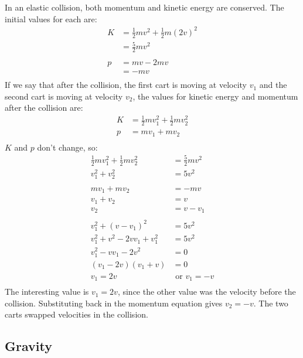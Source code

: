 \documentclass[fleqn,addpoints]{exam}
\begin{document}
\begin{questions}
\begin{solution}
In an elastic collision, both momentum and kinetic energy are conserved.  The initial values for each are:
\begin{align*}
  K &= \frac{1}{2} mv^2 + \frac{1}{2} m (2v)^2 \\
    &= \frac{5}{2} mv^2 \\
  \\
  p &= mv - 2mv \\
    &= -mv \\
\end{align*}
If we say that after the collision, the first cart is moving at velocity $v_1$ and the second cart is moving at velocity
$v_2$, the values for kinetic energy and momentum after the collision are:
\begin{align*}
  K &= \frac{1}{2} mv_1^2 + \frac{1}{2} mv_2^2 \\
  p &= mv_1 + mv_2 \\
\end{align*}
$K$ and $p$ don't change, so:
\begin{align*}
  \frac{1}{2} mv_1^2 + \frac{1}{2} mv_2^2 &= \frac{5}{2} mv^2 \\
  v_1^2 + v_2^2 &= 5v^2 \\
  \\
  mv_1 + mv_2 &= -mv \\
  v_1 + v_2 &= v \\
  v_2 &= v - v_1 \\
  \\
  v_1^2 + (v - v_1)^2 &= 5v^2 \\
  v_1^2 + v^2 - 2vv_1 + v_1^2 &= 5v^2 \\
  v_1^2 - vv_1 - 2v^2 &= 0 \\
  (v_1 - 2v)(v_1 + v) &= 0 \\
  v_1 = 2v &\text{ or } v_1 = -v \\
\end{align*}
The interesting value is $v_1 = 2v$, since the other value was the velocity before the collision.  Substituting back in
the momentum equation gives $v_2 = -v$.  The two carts swapped velocities in the collision.

\end{solution}

\subsection{Gravity}


\end{questions}
\end{document}
